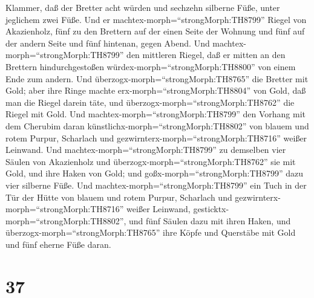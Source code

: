 Klammer,  daß der Bretter acht würden und sechzehn silberne
Füße, unter jeglichem zwei Füße.  Und er
machtex-morph=``strongMorph:TH8799'' Riegel von Akazienholz, fünf zu den
Brettern auf der einen Seite der Wohnung  und fünf auf der
andern Seite und fünf hintenan, gegen Abend.  Und
machtex-morph=``strongMorph:TH8799'' den mittleren Riegel, daß er mitten
an den Brettern hindurchgestoßen würdex-morph=``strongMorph:TH8800'' von
einem Ende zum andern.  Und
überzogx-morph=``strongMorph:TH8765'' die Bretter mit Gold; aber ihre
Ringe machte erx-morph=``strongMorph:TH8804'' von Gold, daß man die
Riegel darein täte, und überzogx-morph=``strongMorph:TH8762'' die Riegel
mit Gold.  Und machtex-morph=``strongMorph:TH8799'' den
Vorhang mit dem Cherubim daran künstlichx-morph=``strongMorph:TH8802''
von blauem und rotem Purpur, Scharlach und
gezwirnterx-morph=``strongMorph:TH8716'' weißer Leinwand. 
Und machtex-morph=``strongMorph:TH8799'' zu demselben vier Säulen von
Akazienholz und überzogx-morph=``strongMorph:TH8762'' sie mit Gold, und
ihre Haken von Gold; und goßx-morph=``strongMorph:TH8799'' dazu vier
silberne Füße.  Und machtex-morph=``strongMorph:TH8799''
ein Tuch in der Tür der Hütte von blauem und rotem Purpur, Scharlach und
gezwirnterx-morph=``strongMorph:TH8716'' weißer Leinwand,
gesticktx-morph=``strongMorph:TH8802'',  und fünf Säulen
dazu mit ihren Haken, und überzogx-morph=``strongMorph:TH8765'' ihre
Köpfe und Querstäbe mit Gold und fünf eherne Füße daran.

\hypertarget{section-36}{%
\section{37}\label{section-36}}

